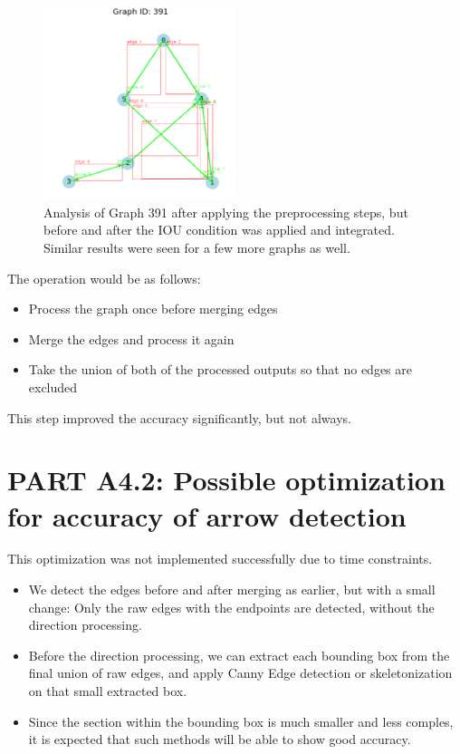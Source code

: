 \documentclass{article}
\begin{document}
\begin{figure}[h!]
    \centering
    \includegraphics[width=0.5\textwidth]{391_after.png}
    \caption{Analysis of Graph 391 after applying the preprocessing steps, but before and after the IOU condition was applied and integrated. Similar results were seen for a few more graphs as well.}
    \label{fig:example}
\end{figure}

The operation would be as follows:
\begin{itemize}
    \item Process the graph once before merging edges
    \item Merge the edges and process it again
    \item Take the union of both of the processed outputs so that no edges are excluded
\end{itemize}

This step improved the accuracy significantly, but not always.

\section{PART A4.2: Possible optimization for accuracy of arrow detection}

This optimization was not implemented successfully due to time constraints.

\begin{itemize}
    \item We detect the edges before and after merging as earlier, but with a small change: Only the raw edges with the endpoints are detected, without the direction processing.
    \item Before the direction processing, we can extract each bounding box from the final union of raw edges, and apply Canny Edge detection or skeletonization on that small extracted box.
    \item Since the section within the bounding box is much smaller and less comples, it is expected that such methods will be able to show good accuracy. 
\end{itemize}
\end{document}
